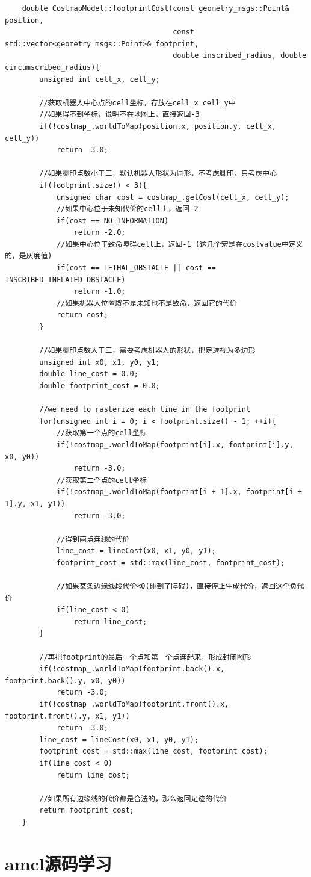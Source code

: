 \documentclass[9pt, oneside]{book}
\begin{document}
\footnotesize
\begin{verbatim}
    double CostmapModel::footprintCost(const geometry_msgs::Point& position, 
                                       const std::vector<geometry_msgs::Point>& footprint,
                                       double inscribed_radius, double circumscribed_radius){
        unsigned int cell_x, cell_y;

        //获取机器人中心点的cell坐标，存放在cell_x cell_y中
        //如果得不到坐标，说明不在地图上，直接返回-3
        if(!costmap_.worldToMap(position.x, position.y, cell_x, cell_y))
            return -3.0;

        //如果脚印点数小于三，默认机器人形状为圆形，不考虑脚印，只考虑中心
        if(footprint.size() < 3){
            unsigned char cost = costmap_.getCost(cell_x, cell_y);
            //如果中心位于未知代价的cell上，返回-2
            if(cost == NO_INFORMATION)
                return -2.0;
            //如果中心位于致命障碍cell上，返回-1 (这几个宏是在costvalue中定义的，是灰度值)
            if(cost == LETHAL_OBSTACLE || cost == INSCRIBED_INFLATED_OBSTACLE)
                return -1.0;
            //如果机器人位置既不是未知也不是致命，返回它的代价
            return cost;
        }

        //如果脚印点数大于三，需要考虑机器人的形状，把足迹视为多边形
        unsigned int x0, x1, y0, y1;
        double line_cost = 0.0;
        double footprint_cost = 0.0;

        //we need to rasterize each line in the footprint
        for(unsigned int i = 0; i < footprint.size() - 1; ++i){
            //获取第一个点的cell坐标
            if(!costmap_.worldToMap(footprint[i].x, footprint[i].y, x0, y0))
                return -3.0;
            //获取第二个点的cell坐标
            if(!costmap_.worldToMap(footprint[i + 1].x, footprint[i + 1].y, x1, y1))
                return -3.0;

            //得到两点连线的代价
            line_cost = lineCost(x0, x1, y0, y1);
            footprint_cost = std::max(line_cost, footprint_cost);

            //如果某条边缘线段代价<0(碰到了障碍)，直接停止生成代价，返回这个负代价
            if(line_cost < 0)
                return line_cost;
        }

        //再把footprint的最后一个点和第一个点连起来，形成封闭图形
        if(!costmap_.worldToMap(footprint.back().x, footprint.back().y, x0, y0))
            return -3.0;
        if(!costmap_.worldToMap(footprint.front().x, footprint.front().y, x1, y1))
            return -3.0;
        line_cost = lineCost(x0, x1, y0, y1);
        footprint_cost = std::max(line_cost, footprint_cost);
        if(line_cost < 0)
            return line_cost;

        //如果所有边缘线的代价都是合法的，那么返回足迹的代价
        return footprint_cost;
    }
\end{verbatim}
\normalsize















\section{amcl源码学习}
\end{document}
